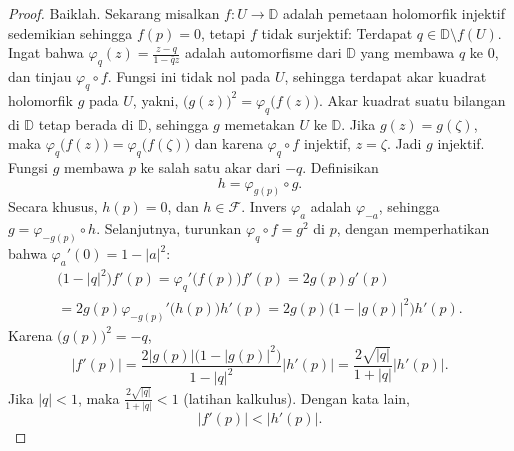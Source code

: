 \documentclass[12pt,openany]{book}
\newcommand{\sabs}[1]{\lvert {#1} \rvert}
\newcommand{\D}{{\mathbb{D}}}
\newcommand{\sF}{{\mathscr{F}}}
\theoremstyle{plain}
\theoremstyle{remark}
\theoremstyle{definition}
\theoremstyle{exercise}
\theoremstyle{example}
\begin{document}
\begin{proof}
Baiklah\@.  Sekarang misalkan $f \colon U \to \D$ adalah pemetaan holomorfik injektif
sedemikian sehingga $f(p) = 0$, tetapi $f$ tidak surjektif: Terdapat
$q \in \D \setminus f(U)$.
Ingat bahwa
$\varphi_q(z) = \frac{z-q}{1-\bar{q}z}$ adalah automorfisme dari $\D$ yang
membawa $q$ ke $0$, dan tinjau $\varphi_q \circ f$.  Fungsi ini tidak
nol pada $U$, sehingga
terdapat akar kuadrat holomorfik $g$ pada $U$, yakni,
${\bigl(g(z)\bigr)}^2 = \varphi_q\bigl(f(z)\bigr)$.
Akar kuadrat suatu bilangan di $\D$ tetap berada di $\D$, sehingga $g$
memetakan $U$ ke $\D$.
Jika $g(z)=g(\zeta)$, maka $\varphi_q\bigl(f(z)\bigr)=\varphi_q\bigl(f(\zeta)\bigr)$ dan karena
$\varphi_q \circ f$ injektif, $z=\zeta$.  Jadi $g$ injektif.  
Fungsi $g$ membawa $p$ ke salah satu akar dari $-q$.
Definisikan
\begin{equation*}
h = \varphi_{g(p)} \circ g .
\end{equation*}
Secara khusus, $h(p) = 0$, dan $h \in \sF$.
Invers $\varphi_a$ adalah $\varphi_{-a}$, sehingga
$g = \varphi_{-g(p)} \circ h$.
Selanjutnya, turunkan
$\varphi_q \circ f = g^2$ di $p$, dengan memperhatikan bahwa
$\varphi_a'(0) = 1-\sabs{a}^2$:
\begin{multline*}
\bigl(1-\sabs{q}^2\bigr) f'(p)
= \varphi_q'\bigl(f(p)\bigr) f'(p)
= 2 g(p) g'(p)
\\
= 2 g(p) \varphi_{-g(p)}'\bigl(h(p)\bigr) h'(p)
= 2 g(p) \bigl(1-\sabs{g(p)}^2\bigr) h'(p) .
\end{multline*}
Karena ${\bigl(g(p)\bigr)}^2 = -q$,
\begin{equation*}
\sabs{f'(p)} =
\frac{2 \sabs{g(p)} \bigl(1-\sabs{g(p)}^2\bigr)}{1-\sabs{q}^2} \sabs{h'(p)}
=
\frac{2 \sqrt{\sabs{q}}}{1+\sabs{q}} \sabs{h'(p)} .
\end{equation*}
Jika $\sabs{q} < 1$, maka $\frac{2 \sqrt{\sabs{q}}}{1+\sabs{q}} < 1$
(latihan kalkulus).
Dengan kata lain,
\begin{equation*}
\sabs{f'(p)} < \sabs{h'(p)} .
\end{equation*}


\end{proof}
\end{document}
